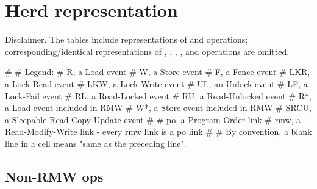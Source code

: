 \chapter{Herd representation}
\label{chp:lkmm:Herd representation}

\begin{Note}
  Disclaimer.
  The tables include representations of  and  operations;
  corresponding/identical representations of , , 
  , , and  operations are omitted.
\end{Note}

\begin{VerbatimU}
#
# Legend:
#	R,	a Load event
#	W,	a Store event
#	F,	a Fence event
#	LKR,	a Lock-Read event
#	LKW,	a Lock-Write event
#	UL,	an Unlock event
#	LF,	a Lock-Fail event
#	RL,	a Read-Locked event
#	RU,	a Read-Unlocked event
#	R*,	a Load event included in RMW
#	W*,	a Store event included in RMW
#	SRCU,	a Sleepable-Read-Copy-Update event
#
#	po,	a Program-Order link
#	rmw,	a Read-Modify-Write link - every rmw link is a po link
#
# By convention, a blank line in a cell means "same as the preceding line".
\end{VerbatimU}

\section{Non-RMW ops}

